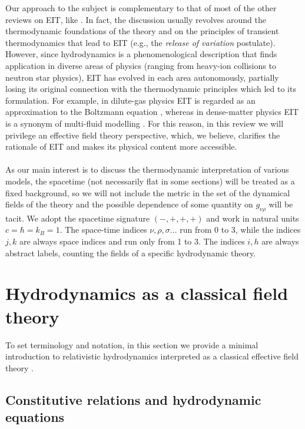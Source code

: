 \documentclass[a4paper, amsfonts, amssymb, amsmath, reprint, twocolumn, showkeys, nofootinbib]{revtex4-2}
\begin{document}
Our approach to the subject is complementary to that of most of the other reviews on EIT, like \citet{Jou_Extended,Salazar2020}. In fact, the discussion usually revolves around the thermodynamic foundations of the theory and on the principles of transient thermodynamics that lead to EIT (e.g., the \textit{release of variation} postulate). 
However, since hydrodynamics is a phenomenological description that finds application in diverse areas of physics (ranging from heavy-ion collisions to neutron star physics),  EIT has evolved in each area autonomously,  partially losing its original connection with the thermodynamic principles which led to its formulation.
For example, in dilute-gas physics EIT is regarded as an approximation to the Boltzmann equation \citep{Denicol2012Boltzmann,chabanov2021}, whereas in dense-matter physics EIT is a synonym of multi-fluid modelling \citep{BulkGavassino,RauWasserman2020}. For this reason, in this review we will privilege an effective field theory perspective, which, we believe, clarifies the rationale of EIT and makes its physical content more accessible. 
\\
\\
As our main interest is to discuss the thermodynamic interpretation of various models, the spacetime (not necessarily flat in some sections) will be treated as a fixed background, so we will not include the metric in the set of the dynamical fields of the theory and the possible dependence of some quantity on $g_{\nu \rho}$ will be tacit. We adopt the spacetime signature $ ( - , +, + , + ) $ and work in natural units $c=\hbar =k_B=1$. The space-time indices $\nu,\rho,\sigma...$ run from 0 to 3, while the indices $j,k$ are always space indices and run only from 1 to 3. The indices $i,h$ are always abstract labels, counting the fields of a specific hydrodynamic theory.


\section{Hydrodynamics as a classical field theory}

To set terminology and notation, in this section we provide a minimal introduction to relativistic hydrodynamics  interpreted as a classical effective field theory  \citep{Dubosky2012_effective,kovtun_lectures_2012}.

\subsection{Constitutive relations and hydrodynamic equations}\label{iPPhi}
\end{document}
